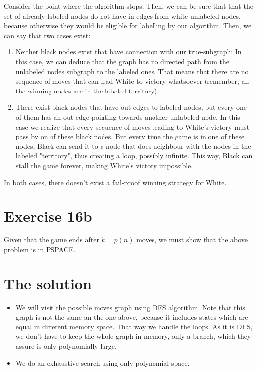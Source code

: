 Consider the point where the algorithm stops. Then, we can be sure that that the
set of already labeled nodes do not have in-edges from white unlabeled nodes,
because otherwise they would be eligible for labelling by our algorithm.
Then, we can say that two cases exist:
\begin{enumerate}
\item Neither black nodes exist that have connection with our true-subgraph:
In this case, we can deduce that the graph has no directed path from the
unlabeled nodes subgraph to the labeled ones. That means that there are no
sequence of moves that can lead White to victory whatsoever (remember, all
the winning nodes are in the labeled territory).
\item There exist black nodes that have out-edges to labeled nodes, but every
one of them has an out-edge pointing towards another unlabeled node. In this case we realize that every sequence of moves leading to White's victory must
pass by on of these black nodes. But every time the game is in one of these
nodes, Black can send it to a node that does neighbour with the nodes in the
labeled "territory", thus creating a loop, possibly infinite. This way, Black
can stall the game forever, making White's victory impossible.
\end{enumerate}

In both cases, there doesn't exist a fail-proof winning strategy for White.



\section*{Exercise 16b}

Given that the game ends after $k=p(n)$ moves, we must show that the above problem
is in PSPACE.

\section*{The solution}

\begin{itemize}
  \item We will visit the possible moves graph using DFS algorithm. Note that this graph is not the same an the one above, because it includes states which are equal in different memory space. That way we handle the loops. As it is DFS, we don't have to keep the whole graph in memory, only a branch, which they assure is only polynomially large.
  \item We do an exhaustive search using only polynomial space.
\end{itemize}
